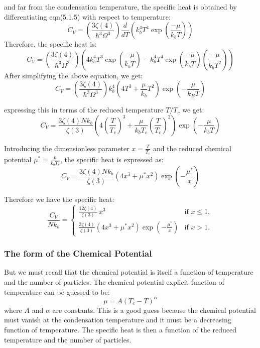\documentclass{article}
\numberwithin{equation}{section}
\numberwithin{equation}{subsection}
\begin{document}
and far from the condensation temperature, the specific heat is obtained by differentiating eqn(5.1.5) with respect to temperature:
\begin{equation}
    C_V = \left(\frac{3\zeta(4)}{\hbar^3\Omega^3}\right) \frac{d}{dT}\left(k_b^4T^4\exp\left(\frac{-\mu}{k_bT}\right)\right) 
\end{equation}
Therefore, the specific heat is:
\begin{equation}
    C_V = \left(\frac{3\zeta(4)}{\hbar^3\Omega^3}\right) \left(4k_b^4T^3\exp\left(\frac{-\mu}{k_bT}\right) - k_b^4T^4\exp\left(\frac{-\mu}{k_bT}\right)\left(\frac{-\mu}{k_bT^2}\right)\right)
\end{equation}
After simplifying the above equation, we get:
\begin{equation}
    C_V = \left(\frac{3\zeta(4)}{\hbar^3 \Omega^3}\right) k_b^4  \left( 4T^3 + \frac{\mu}{k_b} T^2 \right) \exp\left(-\frac{\mu}{k_B T}\right)
\end{equation}

expressing this in terms of the reduced temperature \( T/T_c \) we get:
\begin{equation}
    C_V = \frac{3\zeta(4) N k_b}{\zeta(3)}  \left( 4\left(\frac{T}{T_c}\right)^3 + \frac{\mu}{k_b T_c} \left(\frac{T}{T_c}\right)^2 \right)\exp\left(-\frac{\mu}{k_b T}\right)
\end{equation}

Introducing the dimensionless parameter \( x = \frac{T}{T_c} \) and the reduced chemical potential \( \mu^* = \frac{\mu}{k_b T_c} \), the specific heat is expressed as:
\begin{equation}
    C_V = \frac{3\zeta(4) N k_b}{\zeta(3)}  \left( 4x^3 + \mu^* x^2 \right)\exp\left(-\frac{\mu^*}{x}\right)
\end{equation}

Therefore we have the specific heat:
\begin{equation}
    \frac{C_V}{N k_b} = 
\begin{cases} 
\frac{12 \zeta(4) }{\zeta(3)} \, x^3 & \text{if } x \leq 1, \\[8pt]
\frac{3 \zeta(4) }{\zeta(3)} \left( 4x^3 + \mu^* x^2 \right) \exp\left(-\frac{\mu^*}{x}\right) & \text{if } x > 1.
\end{cases}
\end{equation}
\subsubsection{The form of the Chemical Potential}
But we must recall that the chemical potential is itself a function of temperature and the number of particles. The chemical potential explicit function of temperature can be guessed to be:
\begin{equation}
    \mu = A (T_c - T)^{\alpha}
\end{equation} 
where $A$ and $\alpha$ are constants. This is a good guess because the chemical potential must vanish at the condensation temperature and it must be a decreasing function of temperature. The specific heat is then a function of the reduced temperature and the number of particles.\\
\end{document}
